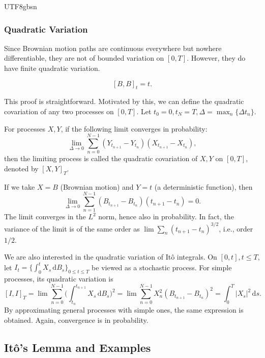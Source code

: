 \documentclass{article}
\begin{document}
\begin{CJK*}{UTF8}{gbsn}
\subsubsection{Quadratic Variation}
Since Brownian motion paths are continuous everywhere but nowhere differentiable, they are not of bounded variation on $[0,T]$. However, they do have finite quadratic variation.

\begin{lemma}
    $$[B,B]_t=t.$$
\end{lemma}

This proof is straightforward. Motivated by this, we can define the quadratic covariation of any two processes on $[0,T]$. Let $t_0=0,t_N=T,\Delta=\max_n\{\Delta t_n\}$.

\begin{definition}
For processes $X,Y$, if the following limit converges in probability:
    $$
    \lim_{\Delta\to0}\sum_{n=0}^{N-1}(Y_{t_{n+1}}-Y_{t_{n}})(X_{t_{n+1}}-X_{t_{n}}),
    $$
then the limiting process is called the quadratic covariation of $X,Y$ on $[0,T]$, denoted by $[X,Y]_T$.
\end{definition}

If we take $X=B$ (Brownian motion) and $Y=t$ (a deterministic function), then
$$
\lim_{\Delta\to0}\sum_{n=1}^{N-1}(B_{t_{n+1}}-B_{t_{n}})(t_{n+1}-t_{n})=0.
$$
The limit converges in the $L^2$ norm, hence also in probability. In fact, the variance of the limit is of the same order as $\lim\sum_n(t_{n+1}-t_{n})^{3/2}$, i.e., order $1/2$.

We are also interested in the quadratic variation of Itô integrals. On $[0,t],t\le T$, let
$I_t=\{\int_0^t X_s\,\mathrm{d}B_s\}_{0\le t\le T}$ be viewed as a stochastic process. For simple processes, its quadratic variation is
$$
[I,I]_T=\lim\sum_{n=0}^{N-1}\Big(\int_{t_n}^{t_{n+1}}X_s\,\mathrm{d}B_s\Big)^2
=\lim\sum_{n=0}^{N-1}X_n^2(B_{t_{n+1}}-B_{t_n})^2
=\int_0^T|X_s|^2\,\mathrm{d}s.
$$
By approximating general processes with simple ones, the same expression is obtained. Again, convergence is in probability.

\subsection{Itô’s Lemma and Examples}

\end{CJK*}
\end{document}
